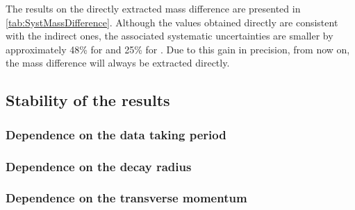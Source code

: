 The results on the directly extracted mass difference are presented in \tab\ref{tab:SystMassDifference}. Although the values obtained directly are consistent with the indirect ones, the associated systematic uncertainties are smaller by approximately 48\% for \rmXi and 25\% for \rmOmega. Due to this gain in precision, from now on, the mass difference will always be extracted directly.

\subsection{Stability of the results}
\label{subsec:StabilityResults}

\subsubsection{Dependence on the data taking period}

\subsubsection{Dependence on the decay radius}



\subsubsection{Dependence on the transverse momentum}
\label{subsubsec:MassDependenceOnPt}

